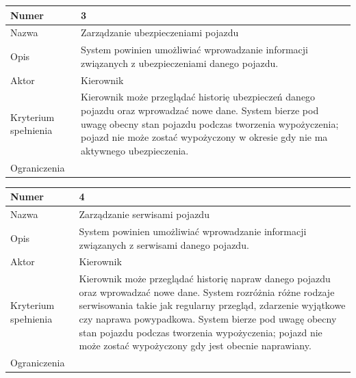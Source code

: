 \documentclass[eng,printmode,openany]{mgr}
\begin{document}
	\begin{table}[H]
		\begin{tabularx}{\textwidth}{|l|X|}
			\hline
			Numer                & 3 \\ \hline
			Nazwa                & Zarządzanie ubezpieczeniami pojazdu \\ \hline
			Opis                 & System powinien umożliwiać wprowadzanie informacji związanych z ubezpieczeniami danego pojazdu. \\ \hline
			Aktor                & Kierownik \\ \hline
			Kryterium spełnienia & Kierownik może przeglądać historię ubezpieczeń danego pojazdu oraz wprowadzać nowe dane. System bierze pod uwagę obecny stan pojazdu podczas tworzenia wypożyczenia;  pojazd nie może zostać wypożyczony w okresie gdy nie ma aktywnego ubezpieczenia. \\ \hline
			Ograniczenia         & \\ \hline
		\end{tabularx}
	\end{table}
	
	\begin{table}[H]
		\begin{tabularx}{\textwidth}{|l|X|}
			\hline
			Numer                & 4 \\ \hline
			Nazwa                & Zarządzanie serwisami pojazdu \\ \hline
			Opis                 & System powinien umożliwiać wprowadzanie informacji związanych z serwisami danego pojazdu. \\ \hline
			Aktor                & Kierownik \\ \hline
			Kryterium spełnienia & Kierownik może przeglądać historię napraw danego pojazdu oraz wprowadzać nowe dane. System rozróżnia różne rodzaje serwisowania takie jak regularny przegląd, zdarzenie wyjątkowe czy naprawa powypadkowa. System bierze pod uwagę obecny stan pojazdu podczas tworzenia wypożyczenia; pojazd nie może zostać wypożyczony gdy jest obecnie naprawiany. \\ \hline
			Ograniczenia         & \\ \hline
		\end{tabularx}
	\end{table}
	
\end{document}

